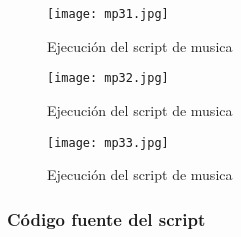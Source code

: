 \documentclass{article}
\begin{document}
\begin{figure}[h!]
\centering
\texttt{[image: mp31.jpg]}
\caption{Ejecución del script de musica}
\end{figure}

\begin{figure}[h!]
\centering
\texttt{[image: mp32.jpg]}
\caption{Ejecución del script de musica}
\end{figure}

\begin{figure}[h!]
\centering
\texttt{[image: mp33.jpg]}
\caption{Ejecución del script de musica}
\end{figure}
\pagebreak
\subsubsection{Código fuente del script}
\end{document}
